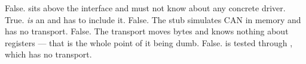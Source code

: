  False.  sits above the interface and must not know about any concrete
driver.
 True.  \emph{is} an  and has to include it.
 False. The stub simulates CAN in memory and has no transport.
 False. The transport moves bytes and knows nothing about registers --- that is the whole
point of it being dumb.
 False.  is tested through , which has no transport.

